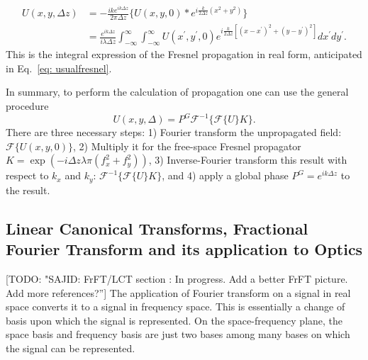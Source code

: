 \documentclass{iucr}              %
\newcommand{\todo}[1]{{\color{red}[TODO: "#1'']}}
\newcommand{\ingreen}[1]{{\color{green}#1}}
\begin{document}
\begin{align}\label{eq: explicit form of convolution integral for propagation}
U(x,y, \Delta z) &= -\frac{i k e^{ik\Delta z}}{2\pi \Delta z} \Big\{U(x,y, 0)* e^{i \frac{k}{2\Delta z}(x^2+y^2)}\Big\} \nonumber \\
&= \frac {e^{i k\Delta z }}{ i \lambda \Delta z} \int_{-\infty}^{\infty} \int_{-\infty}^{\infty}U(x^\prime, y^\prime, 0) e^{i \frac{k}{2 \Delta z} [(x - x^\prime)^2 + (y - y^\prime)^2]} dx^\prime dy^\prime.
\end{align}
This is the integral expression of the Fresnel propagation in real form, anticipated in Eq.~\ref{eq: usualfresnel}. 

In summary, to perform the calculation of propagation one can use the general procedure
\begin{equation}
\label{eq: Fresnel propagation in convolution form}
U(x, y, \Delta) = P^G \mathcal{F}^{-1}\Big\{\mathcal{F}\big\{U \big\} K \Big\}.
\end{equation}
There are three necessary steps: 1) Fourier transform the unpropagated field: $\mathcal{F}\big\{U(x,y,0)\big\}$, 2) Multiply it for the free-space Fresnel propagator
$ K=\exp(-i \Delta z \lambda \pi (f_x^2+f_y^2))$, 3) Inverse-Fourier transform this result with respect to $k_x$ and $k_y$:  $\mathcal{F}^{-1}\Big\{\mathcal{F}\big\{U \big\} K \Big\}$, and 4) apply a global phase $P^G = {e^{ik\Delta z}}$ to the result.




\subsection{Linear Canonical Transforms, Fractional Fourier Transform and its application to Optics}
\todo{SAJID: FrFT/LCT section : In progress. Add a better FrFT picture. Add more references?}
The application of Fourier transform on a signal in real space converts it to a signal in frequency space. This is essentially a change of basis upon which the signal is represented. On the space-frequency plane, the space basis and frequency basis are just two bases among many bases on which the signal can be represented.
\end{document}
